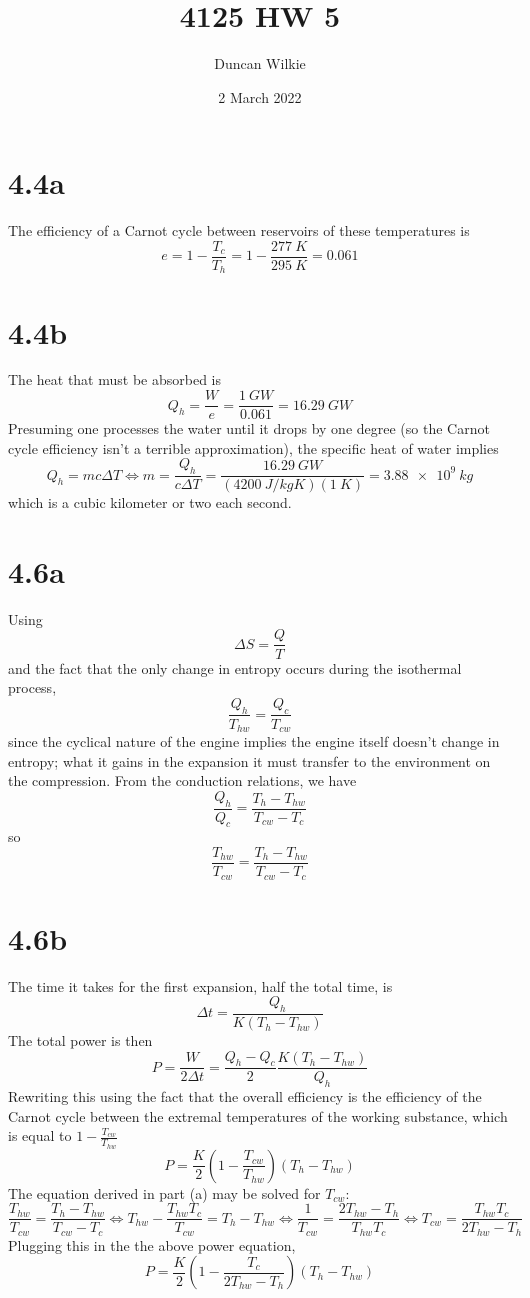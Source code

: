 \message{ !name(hw5.tex)}\documentclass{article}
\title{4125 HW 5}
\author{Duncan Wilkie}
\date{2 March 2022}
\begin{document}


\section*{4.4a}
The efficiency of a Carnot cycle between reservoirs of these temperatures is
\[e=1-\frac{T_{c}}{T_{h}}=1-\frac{\SI{277}{K}}{\SI{295}{K}}=0.061\]

\section*{4.4b}
The heat that must be absorbed is
\[Q_{h}=\frac{W}{e}=\frac{\SI{1}{GW}}{0.061}=\SI{16.29}{GW}\]
Presuming one processes the water until it drops by one degree (so the Carnot cycle efficiency isn't a terrible approximation), the specific heat of water implies
\[Q_{h}=mc\Delta T\Leftrightarrow m=\frac{Q_{h}}{c\Delta T}=\frac{\SI{16.29}{GW}}{(\SI{4200}{J/kg K})(\SI{1}{K})}=\SI{3.88e9}{kg}\]
which is a cubic kilometer or two each second.

\section*{4.6a}
Using
\[\Delta S=\frac{Q}{T}\]
and the fact that the only change in entropy occurs during the isothermal process,
\[\frac{Q_{h}}{T_{hw}}=\frac{Q_{c}}{T_{cw}}\]
since the cyclical nature of the engine implies the engine itself doesn't change in entropy; what it gains in the expansion it must transfer to the environment on the compression.
From the conduction relations, we have
\[\frac{Q_{h}}{Q_{c}}=\frac{T_{h}-T_{hw}}{T_{cw}-T_{c}}\]
so
\[\frac{T_{hw}}{T_{cw}}=\frac{T_{h}-T_{hw}}{T_{cw}-T_{c}}\]
\section*{4.6b}
The time it takes for the first expansion, half the total time, is
\[\Delta t=\frac{Q_{h}}{K(T_{h}-T_{hw})}\]
The total power is then
\[P=\frac{W}{2\Delta t}=\frac{Q_{h}-Q_{c}}{2}\frac{K(T_{h}-T_{hw})}{Q_{h}}\]
Rewriting this using the fact that the overall efficiency is the efficiency of the Carnot cycle between the extremal temperatures of the working substance, which is equal to $1-\frac{T_{cw}}{T_{hw}}$
\[P=\frac{K}{2}\left( 1-\frac{T_{cw}}{T_{hw}} \right)(T_{h}-T_{hw})\]
The equation derived in part (a) may be solved for $T_{cw}$:
\[\frac{T_{hw}}{T_{cw}}=\frac{T_{h}-T_{hw}}{T_{cw}-T_{c}}\Leftrightarrow T_{hw}-\frac{T_{hw}T_{c}}{T_{cw}}=T_{h}-T_{hw}\Leftrightarrow \frac{1}{T_{cw}}=\frac{2T_{hw}-T_{h}}{T_{hw}T_{c}}\Leftrightarrow T_{cw}=\frac{T_{hw}T_{c}}{2T_{hw}-T_{h}}\]
Plugging this in the the above power equation,
\[P=\frac{K}{2}\left( 1-\frac{T_{c}}{2T_{hw}-T_{h}} \right)(T_{h}-T_{hw})\]
\end{document}
